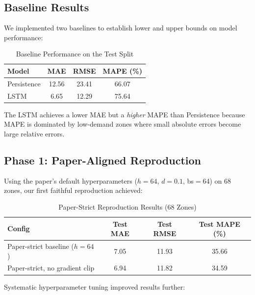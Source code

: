 \documentclass{rapportECL}
\begin{document}
\subsection{Baseline Results}
We implemented two baselines to establish lower and upper bounds on model performance:

\begin{table}[H]
\centering
\caption{Baseline Performance on the Test Split}
\begin{tabular}{@{}lccc@{}}
\toprule
\textbf{Model} & \textbf{MAE} & \textbf{RMSE} & \textbf{MAPE (\%)} \\ \midrule
Persistence & 12.56 & 23.41 & 66.07 \\
LSTM        &  6.65 & 12.29 & 75.64 \\ \bottomrule
\end{tabular}
\end{table}

\noindent The LSTM achieves a lower MAE but a \emph{higher} MAPE than Persistence because MAPE is dominated by low-demand zones where small absolute errors become large relative errors.

\subsection{Phase 1: Paper-Aligned Reproduction}
Using the paper's default hyperparameters ($h{=}64$, $d{=}0.1$, bs$=$64) on 68 zones, our first faithful reproduction achieved:

\begin{table}[H]
\centering
\caption{Paper-Strict Reproduction Results (68 Zones)}
\begin{tabular}{@{}lccc@{}}
\toprule
\textbf{Config} & \textbf{Test MAE} & \textbf{Test RMSE} & \textbf{Test MAPE (\%)} \\ \midrule
Paper-strict baseline ($h{=}64$) & 7.05 & 11.93 & 35.66 \\
Paper-strict, no gradient clip   & 6.94 & 11.82 & 34.59 \\ \bottomrule
\end{tabular}
\end{table}

Systematic hyperparameter tuning improved results further:
\end{document}
